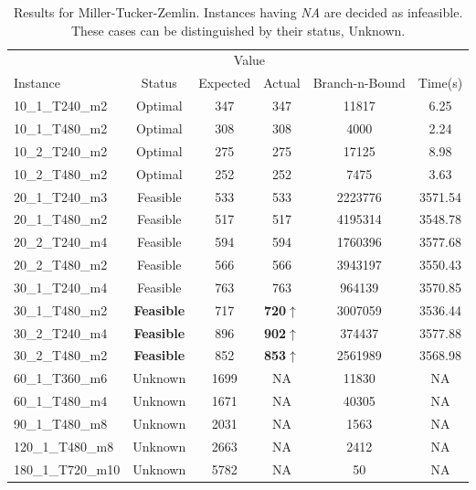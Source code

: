 \begin{center}
\begin{center}
\begin{table}[H]
    \begin{tabular}{ l c c c c c }
    \hline
    &&\multicolumn{2}{c}{Value} && \\
    \cmidrule(r){3-4}
    Instance & Status & Expected & Actual & Branch-n-Bound & Time(s) \\ \hline
    10\_1\_T240\_m2 & Optimal & 347& 347 & 11817 & 6.25 \\
	10\_1\_T480\_m2 & Optimal & 308& 308 & 4000 & 2.24 \\
	10\_2\_T240\_m2 & Optimal & 275 & 275 & 17125 & 8.98 \\
	10\_2\_T480\_m2 & Optimal & 252 & 252 & 7475 & 3.63 \\
	20\_1\_T240\_m3 & Feasible & 533 & 533 & 2223776 & 3571.54 \\
	20\_1\_T480\_m2 & Feasible & 517 & 517 & 4195314 & 3548.78 \\
	20\_2\_T240\_m4 & Feasible & 594 & 594 & 1760396 & 3577.68 \\
	20\_2\_T480\_m2 & Feasible & 566 & 566 & 3943197 & 3550.43 \\
	30\_1\_T240\_m4 & Feasible & 763 & 763 & 964139 & 3570.85 \\
	30\_1\_T480\_m2 & {\bf Feasible} & 717 & {\bf 720}$\uparrow$ & 3007059 &
	3536.44 \\
	30\_2\_T240\_m4 & {\bf Feasible} & 896 & {\bf 902}$\uparrow$ & 374437 & 3577.88
	\\
	30\_2\_T480\_m2 & {\bf Feasible} & 852 & {\bf 853}$\uparrow$ & 2561989 &
	3568.98 \\
	60\_1\_T360\_m6 & Unknown & 1699 & NA & 11830 & NA \\
	60\_1\_T480\_m4 & Unknown & 1671 & NA & 40305 & NA \\
	90\_1\_T480\_m8 & Unknown & 2031 & NA & 1563 & NA \\
	120\_1\_T480\_m8 & Unknown & 2663 & NA & 2412 & NA \\
	180\_1\_T720\_m10 & Unknown & 5782 & NA & 50 & NA \\

    \hline
    \end{tabular}
    \caption{\label{tab:mtz} Results for Miller-Tucker-Zemlin. Instances
    having {\it NA} are decided as infeasible. \\ These cases can be
    distinguished by their status, Unknown. }
\end{table}

\end{center}

\end{center}